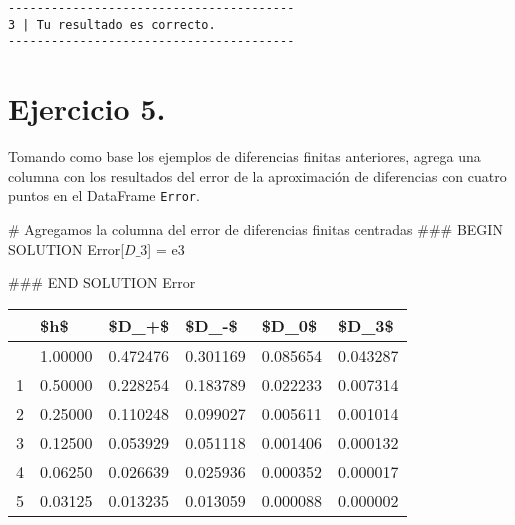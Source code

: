 \documentclass[
  letterpaper,
  DIV=11,
  numbers=noendperiod]{scrreprt}
\newenvironment{Shaded}{\begin{snugshade}}{\end{snugshade}}
\newcommand{\CommentTok}[1]{\textcolor[rgb]{0.37,0.37,0.37}{#1}}
\newcommand{\NormalTok}[1]{\textcolor[rgb]{0.00,0.23,0.31}{#1}}
\newcommand{\OperatorTok}[1]{\textcolor[rgb]{0.37,0.37,0.37}{#1}}
\newcommand{\RegionMarkerTok}[1]{\textcolor[rgb]{0.00,0.23,0.31}{#1}}
\newcommand{\StringTok}[1]{\textcolor[rgb]{0.13,0.47,0.30}{#1}}
\begin{document}
\begin{verbatim}
----------------------------------------
3 | Tu resultado es correcto.
----------------------------------------
\end{verbatim}

\section{Ejercicio 5.}\label{ejercicio-5.}

Tomando como base los ejemplos de diferencias finitas anteriores, agrega
una columna con los resultados del error de la aproximación de
diferencias con cuatro puntos en el DataFrame \texttt{Error}.

\begin{Shaded}
\begin{Highlighting}[]
\CommentTok{\# Agregamos la columna del error de diferencias finitas centradas}
\CommentTok{\#\#\# }\RegionMarkerTok{BEGIN}\CommentTok{ SOLUTION}
\NormalTok{Error[}\StringTok{\textquotesingle{}$D\_3$\textquotesingle{}}\NormalTok{] }\OperatorTok{=}\NormalTok{ e3}

\CommentTok{\#\#\# }\RegionMarkerTok{END}\CommentTok{ SOLUTION}
\NormalTok{Error}
\end{Highlighting}
\end{Shaded}

\begin{longtable}[]{@{}llllll@{}}
\toprule\noalign{}
& \$h\$ & \$D\_+\$ & \$D\_-\$ & \$D\_0\$ & \$D\_3\$ \\
\midrule\noalign{}
\endhead
\bottomrule\noalign{}
\endlastfoot
0 & 1.00000 & 0.472476 & 0.301169 & 0.085654 & 0.043287 \\
1 & 0.50000 & 0.228254 & 0.183789 & 0.022233 & 0.007314 \\
2 & 0.25000 & 0.110248 & 0.099027 & 0.005611 & 0.001014 \\
3 & 0.12500 & 0.053929 & 0.051118 & 0.001406 & 0.000132 \\
4 & 0.06250 & 0.026639 & 0.025936 & 0.000352 & 0.000017 \\
5 & 0.03125 & 0.013235 & 0.013059 & 0.000088 & 0.000002 \\
\end{longtable}
\end{document}
